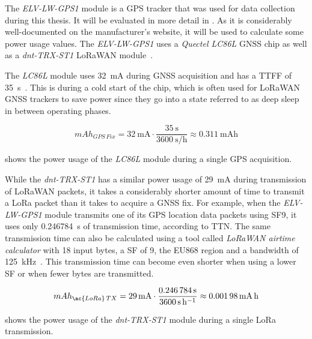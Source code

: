 The \emph{ELV-LW-GPS1} module is a \ac{GPS} tracker that was used for data collection during this thesis.
It will be evaluated in more detail in .
As it is considerably well-documented on the manufacturer's website, it will be used to calculate some power usage values.
The \emph{ELV-LW-GPS1} uses a \emph{Quectel LC86L} \ac{GNSS} chip as well as a \emph{dnt-TRX-ST1} \ac{LoRaWAN} module~\cite{elv_elektronik_ag_elv_2023}.

The \emph{LC86L} module uses \SI{32}{\milli\ampere} during \ac{GNSS} acquisition and has a \ac{TTFF} of \SI{35}{\second}~\cite{quectel_gnss_nodate}.
This is during a cold start of the chip, which is often used for \ac{LoRaWAN} \ac{GNSS} trackers to save power since they go into a state referred to as deep sleep in between operating phases.

\begin{equation}\label{eq:LC86L-fix-consumption}
    mAh_{GPS\,Fix} = \SI{32}{\milli\ampere} \cdot \frac{\SI{35}{\second}}{\SI{3600}{\second\per\hour}} \approx \SI{0.311}{\milli\ampere\hour}
\end{equation}

 shows the power usage of the \emph{LC86L} module during a single \ac{GPS} acquisition.

While the \emph{dnt-TRX-ST1} has a similar power usage of \SI{29}{\milli\ampere} during transmission of \ac{LoRaWAN} packets, it takes a considerably shorter amount of time to transmit a \ac{LoRa} packet than it takes to acquire a \ac{GNSS} fix.
For example, when the \emph{ELV-LW-GPS1} module transmits one of its \ac{GPS} location data packets using \ac{SF}9, it uses only \SI{0.246784}{\second} of transmission time, according to \ac{TTN}.
The same transmission time can also be calculated using a tool called \emph{\ac{LoRaWAN} airtime calculator} with 18 input bytes, a \ac{SF} of 9, the EU868 region and a bandwidth of \SI{125}{\kilo\hertz}~\cite{the_things_network_lorawan_nodate}.
This transmission time can become even shorter when using a lower \ac{SF} or when fewer bytes are transmitted.

\begin{equation}\label{eq:dnt-TRX-ST1-tx-consumption}
    mAh_{\ac{LoRa}\,TX} = \SI{29}{\milli\ampere} \cdot \frac{\SI{0.246784}{\second}}{\SI{3600}{\second\per\hour}} \approx \SI{0.00198}{\milli\ampere\hour}
\end{equation}

 shows the power usage of the \emph{dnt-TRX-ST1} module during a single \ac{LoRa} transmission.

